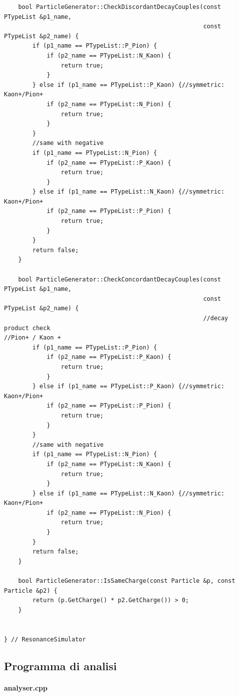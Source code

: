 \documentclass[12pt, a4paper]{article}
\begin{document}
\begin{verbatim}
    bool ParticleGenerator::CheckDiscordantDecayCouples(const PTypeList &p1_name,
                                                        const PTypeList &p2_name) {
        if (p1_name == PTypeList::P_Pion) {
            if (p2_name == PTypeList::N_Kaon) {
                return true;
            }
        } else if (p1_name == PTypeList::P_Kaon) {//symmetric: Kaon+/Pion+
            if (p2_name == PTypeList::N_Pion) {
                return true;
            }
        }
        //same with negative
        if (p1_name == PTypeList::N_Pion) {
            if (p2_name == PTypeList::P_Kaon) {
                return true;
            }
        } else if (p1_name == PTypeList::N_Kaon) {//symmetric: Kaon+/Pion+
            if (p2_name == PTypeList::P_Pion) {
                return true;
            }
        }
        return false;
    }

    bool ParticleGenerator::CheckConcordantDecayCouples(const PTypeList &p1_name,
                                                        const PTypeList &p2_name) {
                                                        //decay product check
//Pion+ / Kaon +
        if (p1_name == PTypeList::P_Pion) {
            if (p2_name == PTypeList::P_Kaon) {
                return true;
            }
        } else if (p1_name == PTypeList::P_Kaon) {//symmetric: Kaon+/Pion+
            if (p2_name == PTypeList::P_Pion) {
                return true;
            }
        }
        //same with negative
        if (p1_name == PTypeList::N_Pion) {
            if (p2_name == PTypeList::N_Kaon) {
                return true;
            }
        } else if (p1_name == PTypeList::N_Kaon) {//symmetric: Kaon+/Pion+
            if (p2_name == PTypeList::N_Pion) {
                return true;
            }
        }
        return false;
    }

    bool ParticleGenerator::IsSameCharge(const Particle &p, const Particle &p2) {
        return (p.GetCharge() * p2.GetCharge()) > 0;
    }


} // ResonanceSimulator
\end{verbatim}

\subsection{Programma di analisi}

\paragraph{analyser.cpp}
\end{document}
